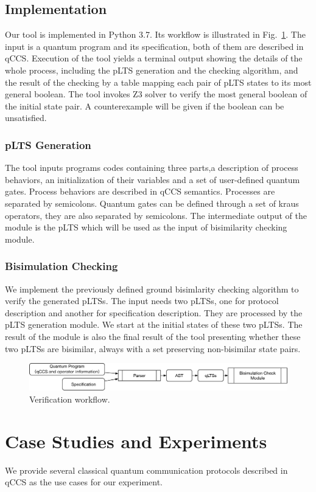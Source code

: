 \documentclass[runningheads]{llncs}
\begin{document}
\subsection{Implementation}
Our tool is implemented in Python 3.7. Its workflow is illustrated in Fig.~\ref{fig:arch}. The input is a quantum program and its specification, both of them are described in qCCS. Execution of the tool yields a terminal output showing the details of the whole process, including the pLTS generation and the checking algorithm, and the result of the checking by a table mapping each pair of pLTS states to its most general boolean. The tool invokes Z3 solver to verify the most general boolean of the initial state pair. A counterexample will be given if the boolean can be unsatisfied.
\subsubsection{pLTS Generation}
The tool inputs programs codes containing three parts,a description of process behaviors, an initialization of their variables and a set of user-defined quantum gates. Process behaviors are described in qCCS semantics. Processes are separated by semicolons. Quantum gates can be defined through a set of kraus operators, they are also separated by semicolons. The intermediate output of the module is the pLTS which will be used as the input of bisimilarity checking module.
\subsubsection{Bisimulation Checking}
We implement the previously defined ground bisimlarity checking algorithm to verify the generated pLTSs. The input needs two pLTSs, one for protocol description and another for specification description. They are processed by the pLTS generation module. We start at the initial states of these two pLTSs. The result of the module is also the final result of the tool presenting whether these two pLTSs are bisimilar, always with a set preserving non-bisimilar state pairs.
\begin{figure}
\centering
\includegraphics[width=\textwidth]{images/architecture.eps}
\caption{Verification workflow.}
\label{fig:arch}
\end{figure}
\section{Case Studies and Experiments}
We provide several classical quantum communication protocols described in qCCS as the use cases for our experiment.
\end{document}
